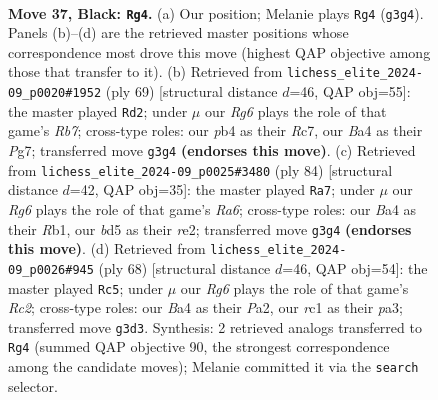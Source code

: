 \documentclass[11pt]{article}
\begin{document}
\clearpage

\begin{figure}[p]\centering
\begin{subfigure}{0.46\textwidth}\centering
\resizebox{\linewidth}{!}{%
\newchessgame
\chessboard[
  setfen={r7/pp3p2/5k2/3B3p/bP2P3/P5rp/8/R1R4K b - - 1 37},
  showmover=false,
  pgfstyle=straightmove, color=movearrow, markmove={g3-g4}
]}
\caption{}
\end{subfigure}\hfill
\begin{subfigure}{0.46\textwidth}\centering
\resizebox{\linewidth}{!}{%
\newchessgame
\chessboard[
  setfen={8/2r2kpp/8/8/1n2BP2/2p3PK/1r5P/2R1R3 b - - 4 35},
  showmover=false,
  pgfstyle=straightmove, color=movearrow, markmove={b2-d2}
]}
\caption{}
\end{subfigure}
\\[4pt]
\begin{subfigure}{0.46\textwidth}\centering
\resizebox{\linewidth}{!}{%
\newchessgame
\chessboard[
  setfen={2r3k1/8/R3p1B1/3b1pP1/3p4/2p3bP/4r1P1/1R5K w - - 0 43},
  showmover=false,
  pgfstyle=straightmove, color=movearrow, markmove={a6-a7}
]}
\caption{}
\end{subfigure}\hfill
\begin{subfigure}{0.46\textwidth}\centering
\resizebox{\linewidth}{!}{%
\newchessgame
\chessboard[
  setfen={k2r3r/6p1/3Pp2p/8/1p1R4/p4P2/P1R4P/7K w - - 1 35},
  showmover=false,
  pgfstyle=straightmove, color=movearrow, markmove={c2-c5}
]}
\caption{}
\end{subfigure}
\caption{\textbf{Move 37, Black: \texttt{Rg4}.} (a) Our position; Melanie plays \texttt{Rg4} (\texttt{g3g4}). Panels (b)--(d) are the retrieved master positions whose correspondence most drove this move (highest QAP objective among those that transfer to it). (b) Retrieved from \texttt{lichess\_elite\_2024-09\_p0020\#1952} (ply 69) [structural distance $d$=46, QAP obj=55]: the master played \texttt{Rd2}; under $\mu$ our \emph{Rg6} plays the role of that game's \emph{Rb7}; cross-type roles: our \emph{p}b4 as their \emph{R}c7, our \emph{B}a4 as their \emph{P}g7; transferred move \texttt{g3g4} \textbf{(endorses this move)}. (c) Retrieved from \texttt{lichess\_elite\_2024-09\_p0025\#3480} (ply 84) [structural distance $d$=42, QAP obj=35]: the master played \texttt{Ra7}; under $\mu$ our \emph{Rg6} plays the role of that game's \emph{Ra6}; cross-type roles: our \emph{B}a4 as their \emph{R}b1, our \emph{b}d5 as their \emph{r}e2; transferred move \texttt{g3g4} \textbf{(endorses this move)}. (d) Retrieved from \texttt{lichess\_elite\_2024-09\_p0026\#945} (ply 68) [structural distance $d$=46, QAP obj=54]: the master played \texttt{Rc5}; under $\mu$ our \emph{Rg6} plays the role of that game's \emph{Rc2}; cross-type roles: our \emph{B}a4 as their \emph{P}a2, our \emph{r}c1 as their \emph{p}a3; transferred move \texttt{g3d3}. Synthesis: 2 retrieved analogs transferred to \texttt{Rg4} (summed QAP objective 90, the strongest correspondence among the candidate moves); Melanie committed it via the \texttt{search} selector.}
\label{fig:thought-m73}
\end{figure}
\end{document}
